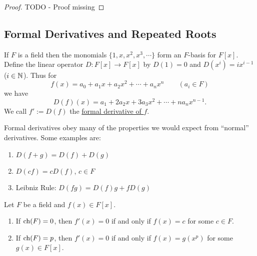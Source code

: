 \documentclass[11pt]{article}
\begin{document}
\begin{proof}

    TODO - Proof missing
    
\end{proof}

\subsection{Formal Derivatives and Repeated Roots}

\begin{definition}
    If $F$ is a field then the monomials $\{1,x,x^2,x^3,\cdots\}$ form an $F$-basis for $F[x]$. Define the linear operator $D:F[x]\to F[x]$ by $D(1)=0$ and $D(x^i)=ix^{i-1}$ ($i\in\mathbb{N}$). Thus for
    \[f(x)=a_0+a_1x+a_2x^2+\cdots+a_nx^n\qquad(a_i\in F)\]
    we have
    \[D(f)(x)=a_1+2a_2x+3a_3x^2+\cdots+na_nx^{n-1}.\]
    We call $f':=D(f)$ the \ul{formal derivative of $f$}.
\end{definition}

\begin{note} Formal derivatives obey many of the properties we would expect from ``normal'' derivatives. Some examples are:
    \begin{enumerate}
        \item $D(f+g)=D(f)+D(g)$
        \item $D(cf)=cD(f)$, $c\in F$
        \item Leibniz Rule: $D(fg)=D(f)g+fD(g)$
    \end{enumerate}
\end{note}

\begin{theorem}
    Let $F$ be a field and $f(x)\in F[x]$.
    \begin{enumerate}
        \item If $\operatorname{ch}(F)=0$, then $f'(x)=0$ if and only if $f(x)=c$ for some $c\in F$.
        \item If $\operatorname{ch}(F)=p$, then $f'(x)=0$ if and only if $f(x)=g(x^p)$ for some $g(x)\in F[x]$.
    \end{enumerate}
\end{theorem}
\end{document}
